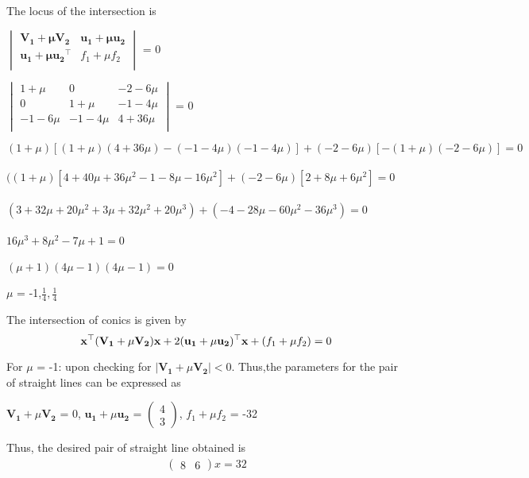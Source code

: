 \documentclass[journal,12pt,twocolumn]{IEEEtran}
\newcommand{\myvec}[1]{\ensuremath{\begin{pmatrix}#1\end{pmatrix}}}
\let\vec\mathbf
\begin{document}
The locus of the intersection is

\begin{center}
$\begin{vmatrix}
\vec{V_1+\mu V_2} & \vec{u_1+\mu u_2} \\ 
\vec{u_1+\mu u_2}^\top & f_1+\mu f_2 \\
\end{vmatrix}$ = 0
\end{center}

\begin{center}
$\begin{vmatrix}
{1+\mu} & 0 & {-2-6\mu} \\ 
0 & {1+\mu} & {-1-4\mu} \\
{-1-6\mu} & {-1-4\mu} & {4+36\mu} \\
\end{vmatrix}$ = 0
\end{center} 
${(1+\mu)}[(1+\mu)(4+36\mu)-(-1-4\mu)(-1-4\mu)]+(-2-6\mu)[-(1+\mu)(-2-6\mu)]=0$ \\
\\$((1+\mu)[4+40\mu+36\mu^2-1-8\mu-16\mu^2]+(-2-6\mu)[2+8\mu+6\mu^2] = 0$ \\
\\$(3+32\mu+20\mu^2+3\mu+32\mu^2+20\mu^3)+(-4-28\mu-60\mu^2-36\mu^3) = 0$ \\
\\$16\mu^3+8\mu^2-7\mu+1 = 0$ \\
\\$(\mu+1)(4\mu-1)(4\mu-1) = 0$
\begin{center}
$\mu$ = -1,$\frac{1}{4},\frac{1}{4}$
\end{center}

The intersection of conics is given by
\begin{equation}
\small{\vec{x^{\top}{(V_1+\mu V_2)}x}+2\vec{(u_1+\mu u_2)^{\top}x}+(f_1+\mu f_2)}=0
\end{equation}



For $\mu$ = -1:
upon checking for $|\vec{V_1}+\mu\vec{V_2}|<0$. Thus,the parameters for the pair of straight lines can be expressed as 
\begin{center}
$\vec{V_1}+\mu\vec{V_2}$ = 0,
$\vec{u_1}+\mu\vec{u_2}$ = $\myvec{4 \\ 3}$,
${f_1+\mu f_2}$ = -32 
\end{center} 

Thus, the desired pair of straight line obtained is 
\begin{align}
\label{eq:two}
\myvec{8 & 6}x = 32
\end{align}
\end{document}
